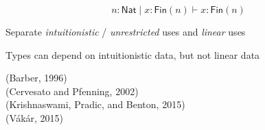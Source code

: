 \documentclass[xetex,serif,mathserif,aspectratio=169]{beamer}
\begin{document}
\begin{frame}
  \begin{displaymath}
    n : \mathsf{Nat} \mid x : \mathsf{Fin}(n) \vdash x : \mathsf{Fin}(n)
  \end{displaymath}

  \bigskip
  \pause

  \point Separate \emph{intuitionistic} / \emph{unrestricted} uses and \emph{linear} uses

  \pause
  \bigskip

  \point Types can depend on intuitionistic data, but not linear data



  \pause
  \bigskip

  {\footnotesize
    \textcolor{black!60}{(Barber, 1996)} \\
    \textcolor{black!60}{(Cervesato and Pfenning, 2002)} \\
    \textcolor{black!60}{(Krishnaswami, Pradic, and Benton, 2015)} \\
    \textcolor{black!60}{(V{\'a}k{\'a}r, 2015)}\\
  }
\end{frame}





\end{document}
